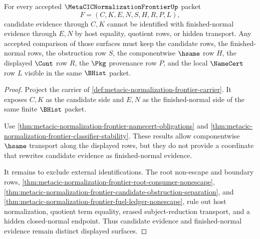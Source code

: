 \begin{theorem}
\label{thm:metacic-normalization-frontier-candidate-evidence-noncollapse}
For every accepted $\MetaCICNormalizationFrontierUp$ packet
$$
F=(C,K,E,N,S,H,R,P,L),
$$
candidate evidence through $C,K$ cannot be identified with finished-normal evidence through $E,N$ by host equality, quotient rows, or hidden transport. Any accepted comparison of those surfaces must keep the candidate rows, the finished-normal rows, the obstruction row $S$, the componentwise $\hsame$ row $H$, the displayed $\Cont$ row $R$, the $\Pkg$ provenance row $P$, and the local $\NameCert$ row $L$ visible in the same $\BHist$ packet.
\end{theorem}
\begin{proof}
Project the carrier of \autoref{def:metacic-normalization-frontier-carrier}. It exposes $C,K$ as the candidate side and $E,N$ as the finished-normal side of the same finite $\BHist$ packet.

Use \autoref{thm:metacic-normalization-frontier-namecert-obligations} and \autoref{thm:metacic-normalization-frontier-classifier-stability}. These results allow componentwise $\hsame$ transport along the displayed rows, but they do not provide a coordinate that rewrites candidate evidence as finished-normal evidence.

It remains to exclude external identifications. The root non-escape and boundary rows, \autoref{thm:metacic-normalization-frontier-root-consumer-nonescape}, \autoref{thm:metacic-normalization-frontier-candidate-obstruction-separation}, and \autoref{thm:metacic-normalization-frontier-fuel-ledger-nonescape}, rule out host normalization, quotient term equality, erased subject-reduction transport, and a hidden closed-normal endpoint. Thus candidate evidence and finished-normal evidence remain distinct displayed surfaces.
\end{proof}

